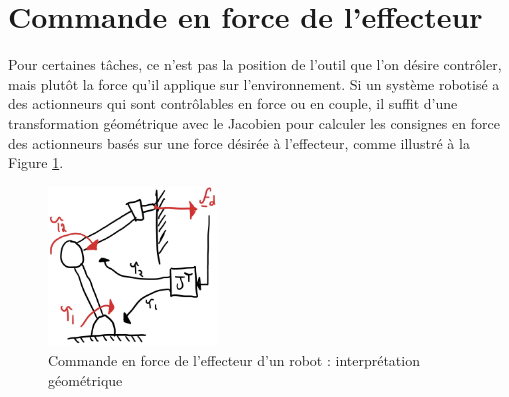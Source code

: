 \newpage
\section{Commande en force de l'effecteur}
\label{sec:forcecontrol}

Pour certaines tâches, ce n'est pas la position de l'outil que l'on désire contrôler, mais plutôt la force qu'il applique sur l'environnement. Si un système robotisé a des actionneurs qui sont contrôlables en force ou en couple, il suffit d'une transformation géométrique avec le Jacobien pour calculer les consignes en force des actionneurs basés sur une force désirée à l'effecteur, comme illustré à la Figure \ref{fig:forcecontroleffectorgeo}.
\begin{figure}[H]
	\centering
	\includegraphics[width=0.4\textwidth]{fig/forcecontroleffectorgeo.jpg}
	\caption{Commande en force de l'effecteur d'un robot : interprétation géométrique}
	\label{fig:forcecontroleffectorgeo}
\end{figure}

